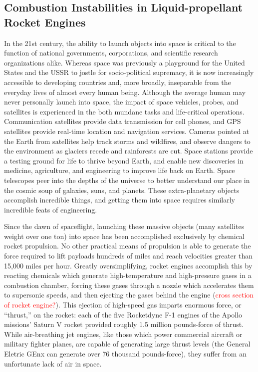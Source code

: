 \subsection{Combustion Instabilities in Liquid-propellant Rocket Engines}

In the 21st century, the ability to launch objects into space is critical to the function of national governments, corporations, and scientific research organizations alike. Whereas space was previously a playground for the United States and the USSR to jostle for socio-political supremacy, it is now increasingly accessible to developing countries and, more broadly, inseparable from the everyday lives of almost every human being. Although the average human may never personally launch into space, the impact of space vehicles, probes, and satellites is experienced in the both mundane tasks and life-critical operations. Communication satellites provide data transmission for cell phones, and GPS satellites provide real-time location and navigation services. Cameras pointed at the Earth from satellites help track storms and wildfires, and observe dangers to the environment as glaciers recede and rainforests are cut. Space stations provide a testing ground for life to thrive beyond Earth, and enable new discoveries in medicine, agriculture, and engineering to improve life back on Earth. Space telescopes peer into the depths of the universe to better understand our place in the cosmic soup of galaxies, suns, and planets. These extra-planetary objects accomplish incredible things, and getting them into space requires similarly incredible feats of engineering.

Since the dawn of spaceflight, launching these massive objects (many satellites weight over one ton) into space has been accomplished exclusively by chemical rocket propulsion. No other practical means of propulsion is able to generate the force required to lift payloads hundreds of miles and reach velocities greater than 15,000 miles per hour. Greatly oversimplifying, rocket engines accomplish this by reacting chemicals which generate high-temperature and high-pressure gases in a combustion chamber, forcing these gases through a nozzle which accelerates them to supersonic speeds, and then ejecting the gases behind the engine (\textcolor{red}{cross section of rocket engine?}). This ejection of high-speed gas imparts enormous force, or ``thrust,'' on the rocket: each of the five Rocketdyne F-1 engines of the Apollo missions' Saturn V rocket provided roughly 1.5 million pounds-force of thrust. While air-breathing jet engines, like those which power commercial aircraft or military fighter planes, are capable of generating large thrust levels (the General Eletric GEnx can generate over 76 thousand pounds-force), they suffer from an unfortunate lack of air in space.

